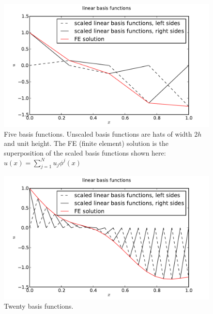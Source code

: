 \documentclass[10pt]{article}
\begin{document}
\begin{figure}[ht]
    \centering
    \includegraphics[width=\columnwidth,keepaspectratio=true]{./hw7-basis_functions-N5.pdf}
    \caption{Five basis functions. Unscaled basis functions are hats of width $2h$ and unit height. The FE (finite element) solution is the superposition of the scaled basis functions shown here: $u(x)= \sum_{j=1}^{N}{u_j \phi^j(x)}$}
    \label{fig:N5}
\end{figure}

\begin{figure}[ht]
    \centering
    \includegraphics[width=\columnwidth,keepaspectratio=true]{./hw7-basis_functions-N20.pdf}
    \caption{Twenty basis functions.}
    \label{fig:N20}
\end{figure}
\end{document}
